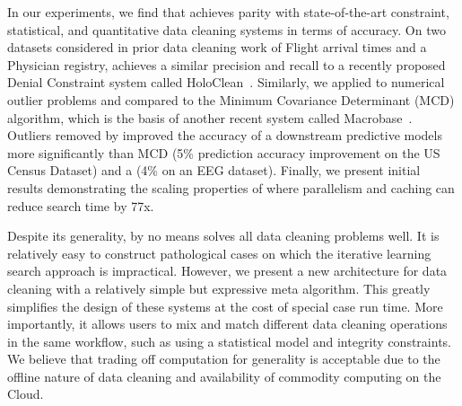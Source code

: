 In our experiments, we find that \sys achieves parity with state-of-the-art constraint, statistical, and quantitative data cleaning systems in terms of accuracy.
On two datasets considered in prior data cleaning work of Flight arrival times and a Physician registry, \sys achieves a similar precision and recall to a recently proposed Denial Constraint system called HoloClean~\cite{rekatsinas2017holoclean}. 
Similarly, we applied \sys to numerical outlier problems and compared to the Minimum Covariance Determinant (MCD) algorithm, which is the basis of another recent system called Macrobase~\cite{bailis2016macrobase}.
Outliers removed by \sys  improved the accuracy of a downstream predictive models more significantly than MCD (5\% prediction accuracy improvement on the US Census Dataset) and a (4\% on an EEG dataset). 
Finally, we present initial results demonstrating the scaling properties of \sys where parallelism and caching can reduce search time by 77x.

Despite its generality, \sys by no means solves all data cleaning problems well. It is relatively easy to construct pathological cases on which the iterative learning search approach is impractical. 
However, we present a new architecture for data cleaning with a relatively simple but expressive meta algorithm. 
This greatly simplifies the design of these systems at the cost of special case run time.
More importantly, it allows users to mix and match different data cleaning operations in the same workflow, such as using a statistical model and integrity constraints.
We believe that trading off computation for generality is acceptable due to the offline nature of data cleaning and availability of commodity computing on the Cloud.




